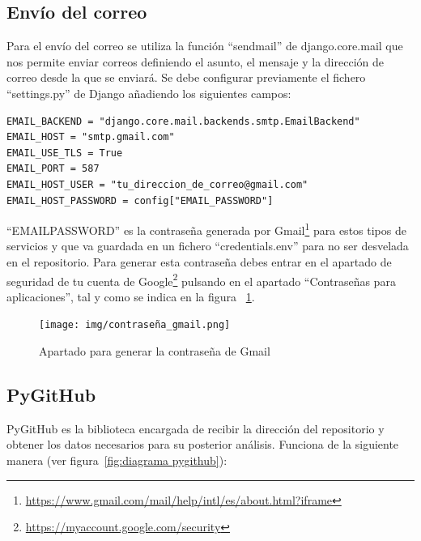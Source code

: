 \documentclass[a4paper, 12pt]{book}
\begin{document}
\subsection{Envío del correo}
Para el envío del correo se utiliza la función ``send\textunderscore mail'' de django.core.mail que nos permite enviar correos definiendo el asunto, el mensaje y la dirección de correo desde la que se enviará. Se debe configurar previamente el fichero ``settings.py'' de Django añadiendo los siguientes campos:
\begin{verbatim}
EMAIL_BACKEND = "django.core.mail.backends.smtp.EmailBackend"
EMAIL_HOST = "smtp.gmail.com"
EMAIL_USE_TLS = True
EMAIL_PORT = 587
EMAIL_HOST_USER = "tu_direccion_de_correo@gmail.com"
EMAIL_HOST_PASSWORD = config["EMAIL_PASSWORD"]
\end{verbatim}
``EMAIL\textunderscore PASSWORD'' es la contraseña generada por Gmail\footnote{\url{https://www.gmail.com/mail/help/intl/es/about.html?iframe}} para estos tipos de servicios y que va guardada en un fichero ``credentials.env'' para no ser desvelada en el repositorio. Para generar esta contraseña debes entrar en el apartado de seguridad de tu cuenta de Google\footnote{\url{https://myaccount.google.com/security}} pulsando en el apartado ``Contraseñas para aplicaciones'', tal y como se indica en la figura ~\ref{fig:contraseña gmail}.
\begin{figure}
    \centering
    \texttt{[image: img/contraseña\_gmail.png]}
    \caption{Apartado para generar la contraseña de Gmail}\label{fig:contraseña gmail}
\end{figure}
\subsection{PyGitHub}
PyGitHub es la biblioteca encargada de recibir la dirección del repositorio y obtener los datos necesarios para su posterior análisis. Funciona de la siguiente manera (ver figura~\ref{fig:diagrama pygithub}):
\end{document}
